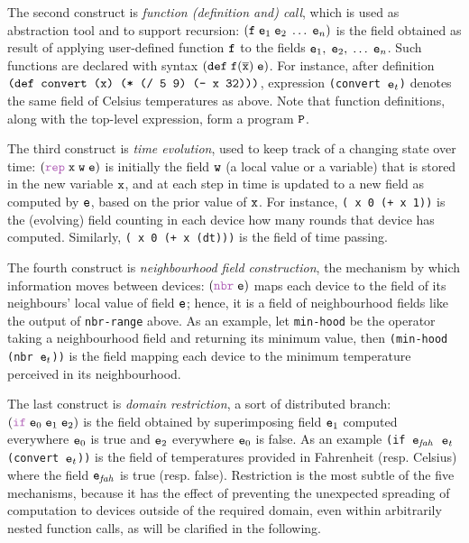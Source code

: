\documentclass[12pt,a4paper,twoside,openright]{book}
\begin{document}
The second construct is \emph{function (definition and) call}, which is used as abstraction tool and to support recursion: $(\texttt{f} \; \texttt{e}_1\;\texttt{e}_2\;\ldots\;\texttt{e}_n)$ is the field obtained as result of applying user-defined function $\texttt{f}$ to the fields $\texttt{e}_1,\;\texttt{e}_2,\;\ldots\;\texttt{e}_n$. Such functions are declared with syntax $(\texttt{def} \; \texttt{f} (\overline{\texttt{x}}) \; \texttt{e})$.
%
For instance, after definition $\texttt{(\texttt{def}~convert (x) (* (/ 5 9) (- x 32)))}$, expression \texttt{(convert $\texttt{e}_t$)} denotes the same field of Celsius temperatures as above.
%
Note that function definitions, along with the top-level expression, form a program $\texttt{P}$.

The third construct is \emph{time evolution}, used to keep track of a changing state over time: $(\repN \; \xname\; \we \; \e)$ is initially the field $\texttt{w}$ (a local value or a variable) that is stored in the new variable $\texttt{x}$, and at each step in time is updated to a new field as computed by $\texttt{e}$, based on the prior value of $\texttt{x}$.
%
For instance, \mbox{\texttt{(\repN~x 0 (+ x 1))}} is the (evolving) field counting in each device how many rounds that device has computed.
%
Similarly, \mbox{\texttt{(\repN~x 0 (+ x (dt)))}} is the field of time passing.

The fourth construct is \emph{neighbourhood field construction}, the mechanism by which information moves between devices: $(\nbrN \; \e)$ maps each device to the field of its neighbours' local value of field $\texttt{e}$; hence, it is a field of neighbourhood fields like the output of \texttt{nbr-range} above. As an example, let \texttt{min-hood} be the operator taking a neighbourhood field and returning its minimum value, then \texttt{(min-hood (nbr $\texttt{e}_t$))} is the field mapping each device to the minimum temperature perceived in its neighbourhood.

The last construct is \emph{domain restriction}, a sort of distributed branch: $(\ifN \; \e_0\; \e_1 \; \e_2)$ is the field obtained by superimposing field $\texttt{e}_1$ computed everywhere $\texttt{e}_0$ is true and $\texttt{e}_2$ everywhere $\texttt{e}_0$ is false.
%
As an example \mbox{\texttt{(if $\texttt{e}_{\mathit{fah}}$ $\texttt{e}_t$ (convert $\texttt{e}_t$))}} is the field of temperatures provided in Fahrenheit (resp. Celsius) where the field $\texttt{e}_{\mathit{fah}}$ is true (resp. false).
%
Restriction is the most subtle of the five mechanisms, because it has the effect of preventing the unexpected spreading of computation to devices outside of the required domain, even within arbitrarily nested function calls, as will be clarified in the following.
\end{document}
